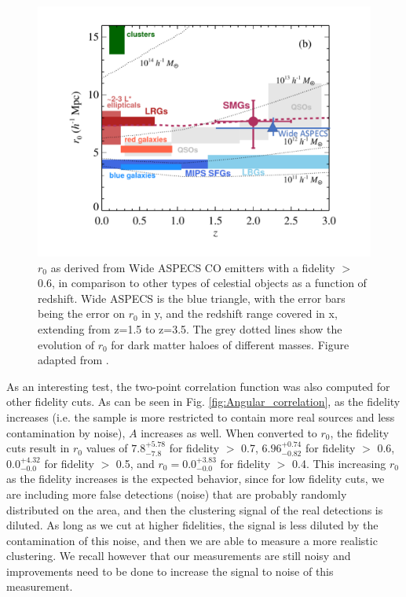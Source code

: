 \begin{figure}[!htbp]
\centering \includegraphics[width=120mm]{clustering/Hickox_WideASPECS.png}
\caption{$r_0$ as derived from Wide ASPECS CO emitters with a fidelity $>$ 0.6, in comparison to other types of celestial objects as a function of redshift. Wide ASPECS is the blue triangle, with the error bars being the error on $r_0$ in y, and the redshift range covered in x, extending from z=1.5 to z=3.5. The grey dotted lines show the evolution of $r_0$ for dark matter haloes of different masses. Figure adapted from \cite{10.1111/j.1365-2966.2011.20303.x}.}
\label{fig:Hickox_ASPECS}
\end{figure}

As an interesting test, the two-point correlation function was also computed for other fidelity cuts. As can be seen in Fig. \ref{fig:Angular_correlation}, as the fidelity increases (i.e. the sample is more restricted to contain more real sources and less contamination by noise), $A$ increases as well. When converted to $r_0$, the fidelity cuts result in $r_0$ values of $7.8_{-7.8}^{+5.78}$ for fidelity $>$ 0.7, $6.96_{-0.82}^{+0.74}$ for fidelity $>$ 0.6, $0.0_{-0.0}^{+4.32}$ for fidelity $>$ 0.5, and $r_0 = 0.0_{-0.0}^{+3.83}$ for fidelity $>$ 0.4. This increasing $r_0$ as the fidelity increases is the expected behavior, since for low fidelity cuts, we are including more false detections (noise) that are probably randomly distributed on the area, and then the  clustering signal of the real detections is diluted.  As long as we cut at higher fidelities, the signal is less diluted by the contamination of this noise, and then we are able to measure a more realistic clustering. We recall however that our measurements are still noisy and improvements need to be done to increase the signal to noise of this measurement.  

